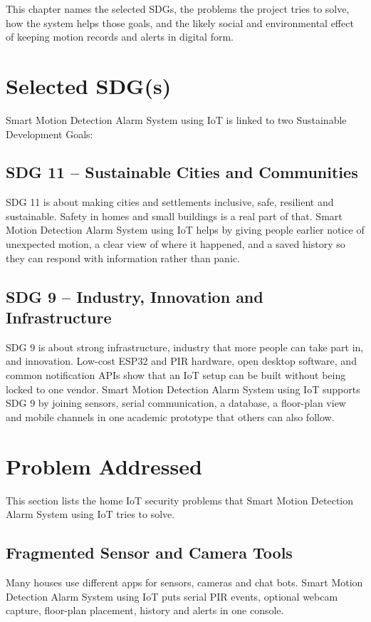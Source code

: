 \documentclass[12pt,a4paper]{report}
\begin{document}
This chapter names the selected SDGs, the problems the project tries to solve, how the system helps those goals, and the likely social and environmental effect of keeping motion records and alerts in digital form.

\section{Selected SDG(s)}

Smart Motion Detection Alarm System using IoT is linked to two Sustainable Development Goals:

\subsection{SDG 11 -- Sustainable Cities and Communities}
SDG 11 is about making cities and settlements inclusive, safe, resilient and sustainable. Safety in homes and small buildings is a real part of that. Smart Motion Detection Alarm System using IoT helps by giving people earlier notice of unexpected motion, a clear view of where it happened, and a saved history so they can respond with information rather than panic.

\subsection{SDG 9 -- Industry, Innovation and Infrastructure}
SDG 9 is about strong infrastructure, industry that more people can take part in, and innovation. Low-cost ESP32 and PIR hardware, open desktop software, and common notification APIs show that an IoT setup can be built without being locked to one vendor. Smart Motion Detection Alarm System using IoT supports SDG 9 by joining sensors, serial communication, a database, a floor-plan view and mobile channels in one academic prototype that others can also follow.

\section{Problem Addressed}

This section lists the home IoT security problems that Smart Motion Detection Alarm System using IoT tries to solve.

\subsection{Fragmented Sensor and Camera Tools}
Many houses use different apps for sensors, cameras and chat bots. Smart Motion Detection Alarm System using IoT puts serial PIR events, optional webcam capture, floor-plan placement, history and alerts in one console.
\end{document}
